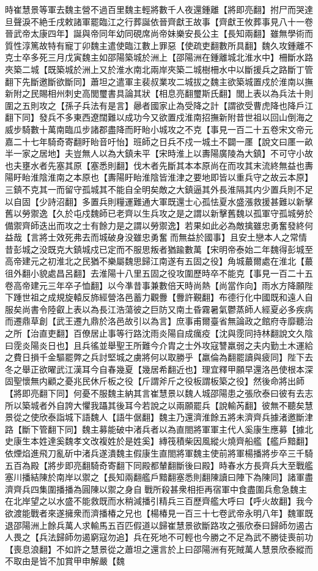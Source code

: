時崔慧景等軍去魏主營不過百里魏主輕將數千人夜還鍾離【將即亮翻】拊尸而哭達旦聲淚不絶壬戌敕諸軍罷臨江之行葬誕依晉齊獻王故事【齊獻王攸葬事見八十一卷晉武帝太康四年】誕與帝同年幼同硯席尚帝妹樂安長公主【長知兩翻】雖無學術而質性淳篤故特有寵丁卯魏主遣使臨江數上罪惡【使疏吏翻數所具翻】魏久攻鍾離不克士卒多死三月戊寅魏主如邵陽築城於洲上【邵陽洲在鍾離城北淮水中】柵斷水路夾築二城【既築城於洲上又於淮水南北兩岸夾築二城樹柵水中以斷援兵之路斷丁管翻下先斷邀斷欲斷同】蕭坦之遣軍主裴叔業攻二城拔之魏主欲築城置戍於淮南以撫新附之民賜相州刺史高閭璽書具論其狀【相息亮翻璽斯氏翻】閭上表以為兵法十則圍之五則攻之【孫子兵法有是言】曏者國家止為受降之計【謂欲受曹虎降也降戶江翻下同】發兵不多東西遼闊難以成功今又欲置戍淮南招撫新附昔世祖以回山倒海之威步騎數十萬南臨瓜步諸郡盡降而盱眙小城攻之不克【事見一百二十五卷宋文帝元嘉二十七年騎奇寄翻盱眙音吁怡】班師之日兵不戍一城土不闢一㕓【說文曰㕓一畝半一家之居地】夫豈無人以為大鎮未平【宋時淮上以夀陽廣陵為大鎮】不可守小故也夫壅水者先塞其原【塞悉則翻】伐木者先斷其本本原尚在而攻其末流終無益也夀陽盱眙淮陰淮南之本原也【夀陽盱眙淮陰皆淮津之要地即皆以重兵守之故云本原】三鎮不克其一而留守孤城其不能自全明矣敵之大鎮逼其外長淮隔其内少置兵則不足以自固【少詩沼翻】多置兵則糧運難通大軍既還士心孤怯夏水盛漲救援甚難以新擊舊以勞禦逸【久於屯戍魏師已老齊以生兵攻之是之謂以新擊舊魏以孤軍守孤城勞於備禦齊師迭出而攻之士有餘力是之謂以勞禦逸】若果如此必為敵擒雖忠勇奮發終何益哉【言將士效死弗去而城破身没雖忠勇奮而無益於國事】且安土戀本人之常情昔彭城之没既克大鎮城戍已定而不服思叛者猶踰數萬【宋明帝泰始二年魏得彭城至高帝建元之初淮北之民猶不樂屬魏思歸江南遂有五固之役】角城蕞爾處在淮北【蕞徂外翻小貌處昌呂翻】去淮陽十八里五固之役攻圍歷時卒不能克【事見一百二十五卷高帝建元三年卒子恤翻】以今凖昔事兼數倍天時尚熱【尚當作向】雨水方降願陛下踵世祖之成規旋轅反斾經營洛邑蓄力觀釁【釁許覲翻】布德行化中國既和遠人自服矣尚書令陸叡上表以為長江浩蕩彼之巨防又南土昏霧暑氣鬱蒸師人經夏必多疾病而遷鼎草創【武王遷九鼎於洛邑故引以為言】庶事甫爾臺省無論政之館府寺靡聽治之所【治直吏翻】百僚居止事等行路沈雨炎陽自成癘疫【沈與霃同持林翻說文久陰曰霃炎陽炎日也】且兵徭並舉聖王所難今介胄之士外攻寇讐羸弱之夫内勤土木運給之費日損千金驅罷弊之兵討堅城之虜將何以取勝乎【羸倫為翻罷讀與疲同】陛下去冬之舉正欲曜武江漢耳今自春幾夏【幾居希翻近也】理宜釋甲願早還洛邑使根本深固聖懷無内顧之憂兆民休斤板之役【斤謂斧斤之役板謂板築之役】然後命將出師【將即亮翻下同】何憂不服魏主納其言崔慧景以魏人城邵陽患之張欣泰曰彼有去志所以築城者外自誇大懼我躡其後耳今若說之以兩願罷兵【說輸芮翻】彼無不聽矣慧景從之使欣泰詣城下語魏人【語牛倨翻】魏主乃還濟淮餘五將未濟齊兵據渚邀斷津路【斷下管翻下同】魏主募能破中渚兵者以為直閤將軍軍主代人奚康生應募【據北史康生本姓達奚魏孝文改複姓於是姓奚】縳筏積柴因風縱火燒齊船艦【艦戶黯翻】依煙焰進飛刀亂斫中渚兵遂潰魏主假康生直閤將軍魏主使前將軍楊播將步卒三千騎五百為殿【將步即亮翻騎奇寄翻下同殿都輦翻斷後曰殿】時春水方長齊兵大至戰艦塞川播結陳於南岸以禦之【長知兩翻艦戶黯翻塞悉則翻陳讀曰陣下為陳同】諸軍盡濟齊兵四集圍播播為圓陳以禦之身自戰所殺甚衆相拒再宿軍中食盡圍兵愈急魏主在北岸望之以水盛不能救既而水稍減播引精兵三百歷齊艦大呼曰【呼火故翻】我今欲渡能戰者來遂擁衆而濟播椿之兄也【楊椿見一百三十七卷武帝永明八年】魏軍既退邵陽洲上餘兵萬人求輸馬五百匹假道以歸崔慧景欲斷路攻之張欣泰曰歸師勿遏古人畏之【兵法歸師勿遏窮寇勿追】兵在死地不可輕也今勝之不足為武不勝徒喪前功【喪息浪翻】不如許之慧景從之蕭坦之還言於上曰邵陽洲有死賊萬人慧景欣泰縱而不取由是皆不加賞甲申解嚴【魏